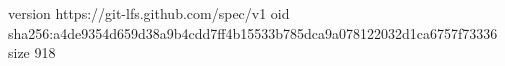 version https://git-lfs.github.com/spec/v1
oid sha256:a4de9354d659d38a9b4cdd7ff4b15533b785dca9a078122032d1ca6757f73336
size 918
